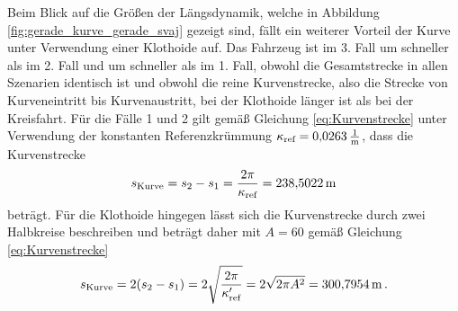 Beim Blick auf die Größen der Längsdynamik, welche in Abbildung \ref{fig:gerade_kurve_gerade_svaj} gezeigt sind, fällt ein weiterer Vorteil der Kurve unter Verwendung einer Klothoide auf. Das Fahrzeug ist im 3. Fall um  schneller als im 2. Fall und um  schneller als im 1. Fall, obwohl die Gesamtstrecke in allen Szenarien identisch ist und obwohl die reine Kurvenstrecke, also die Strecke von Kurveneintritt bis Kurvenaustritt, bei der Klothoide länger ist als bei der Kreisfahrt. Für die Fälle 1 und 2 gilt gemäß Gleichung \eqref{eq:Kurvenstrecke} unter Verwendung der konstanten Referenzkrümmung $\kappa_{\textrm{ref}} = 0{,}0263\,\mathrm{\frac{\mathrm{1}}{\mathrm{m}}}$, dass die Kurvenstrecke 
\begin{equation}
	s_\textrm{Kurve} = s_2 - s_1 = \frac{2\pi}{\kappa_{\textrm{ref}}} = 238{,}5022\,\mathrm{m}
\end{equation}
beträgt. Für die Klothoide hingegen lässt sich die Kurvenstrecke durch zwei Halbkreise beschreiben und beträgt daher mit $A = 60$ gemäß Gleichung \eqref{eq:Kurvenstrecke}
\begin{equation}
s_\textrm{Kurve} = 2(s_2 - s_1) = 2\sqrt{\frac{2\pi}{\kappa'_{\textrm{ref}}}} = 2\sqrt{2\pi A^2} = 300{,}7954\,\mathrm{m}\,.
\end{equation}
